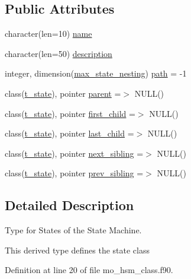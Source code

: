 \subsection*{Public Attributes}
\begin{DoxyCompactItemize}
\item 
character(len=10) \hyperlink{structmo__hsm__class_1_1t__state_ac8d63780002fd7fa1935c398be583cec}{name}
\item 
character(len=50) \hyperlink{structmo__hsm__class_1_1t__state_ad0686bddd616c0c58ba9ab69d5fe5bcd}{description}
\item 
integer, dimension(\hyperlink{namespacemo__hsm__class_a32995d2c8288f1be7f2ea26c26a24892}{max\+\_\+state\+\_\+nesting}) \hyperlink{structmo__hsm__class_1_1t__state_ab3246c59be74c1498c6eff0aac664ae4}{path} = -\/1
\item 
class(\hyperlink{structmo__hsm__class_1_1t__state}{t\+\_\+state}), pointer \hyperlink{structmo__hsm__class_1_1t__state_a88cd96170047dcb13c901b0e6757b8b6}{parent} =$>$ N\+U\+L\+L()
\item 
class(\hyperlink{structmo__hsm__class_1_1t__state}{t\+\_\+state}), pointer \hyperlink{structmo__hsm__class_1_1t__state_a31bbd54f61a830643121688f03ce50c2}{first\+\_\+child} =$>$ N\+U\+L\+L()
\item 
class(\hyperlink{structmo__hsm__class_1_1t__state}{t\+\_\+state}), pointer \hyperlink{structmo__hsm__class_1_1t__state_a70f8607c4cc9e25636b875f34ce0a4b4}{last\+\_\+child} =$>$ N\+U\+L\+L()
\item 
class(\hyperlink{structmo__hsm__class_1_1t__state}{t\+\_\+state}), pointer \hyperlink{structmo__hsm__class_1_1t__state_a61cd4f70194c69639c03f7454a86c712}{next\+\_\+sibling} =$>$ N\+U\+L\+L()
\item 
class(\hyperlink{structmo__hsm__class_1_1t__state}{t\+\_\+state}), pointer \hyperlink{structmo__hsm__class_1_1t__state_a96f33ab989c4e792345834adef8e86cf}{prev\+\_\+sibling} =$>$ N\+U\+L\+L()
\end{DoxyCompactItemize}


\subsection{Detailed Description}
Type for States of the State Machine. 

This derived type defines the state class 

Definition at line 20 of file mo\+\_\+hsm\+\_\+class.\+f90.



